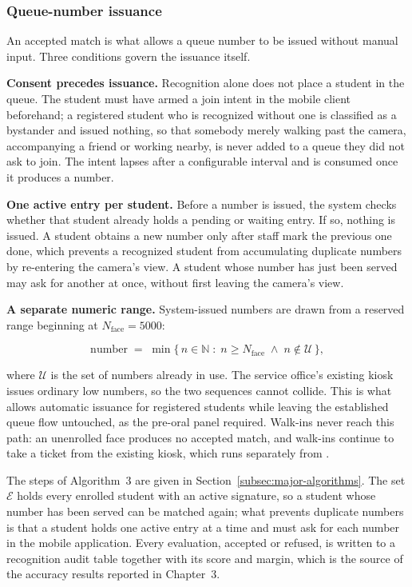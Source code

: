 \subsubsection{Queue-number issuance}
\label{subsubsec:minting}

An accepted match is what allows a queue number to be issued without
manual input. Three conditions govern the issuance itself.

\textbf{Consent precedes issuance.} Recognition alone does not place a
student in the queue. The student must have armed a join intent in the
mobile client beforehand; a registered student who is recognized without
one is classified as a bystander and issued nothing, so that somebody
merely walking past the camera, accompanying a friend or working nearby,
is never added to a queue they did not ask to join. The intent lapses
after a configurable interval and is consumed once it produces a number.

\textbf{One active entry per student.} Before a number is issued, the
system checks whether that student already holds a pending or waiting
entry. If so, nothing is issued. A student obtains a new number only
after staff mark the previous one done, which prevents a
recognized student from accumulating duplicate numbers by re-entering the
camera's view. A student whose number has just been served may ask for
another at once, without first leaving the camera's view.

\textbf{A separate numeric range.} System-issued numbers are drawn from a
reserved range beginning at $N_{\mathrm{face}} = 5000$:

\begin{equation}
\mathrm{number} \;=\; \min\bigl\{\, n \in \mathbb{N} \;:\;
n \geq N_{\mathrm{face}} \;\wedge\; n \notin \mathcal{U} \,\bigr\},
\label{eq:mint}
\end{equation}

\noindent where $\mathcal{U}$ is the set of numbers already in use. The
service office's existing kiosk issues ordinary low numbers, so the two
sequences cannot collide. This is what allows automatic issuance for
registered students while leaving the established queue flow untouched,
as the pre-oral panel required. Walk-ins never reach this path: an
unenrolled face produces no accepted match, and walk-ins continue to
take a ticket from the existing kiosk, which runs separately from
\sysname{}.


\noindent The steps of Algorithm~3 are given in
Section~\ref{subsec:major-algorithms}. The set $\mathcal{E}$ holds every
enrolled student with an active signature, so a student whose number
has been served can be matched again; what prevents duplicate numbers is
that a student holds one active entry at a time and must ask for each
number in the mobile application. Every evaluation, accepted or refused, is written to a
recognition audit table together with its score and margin, which is the
source of the accuracy results reported in Chapter~3.

